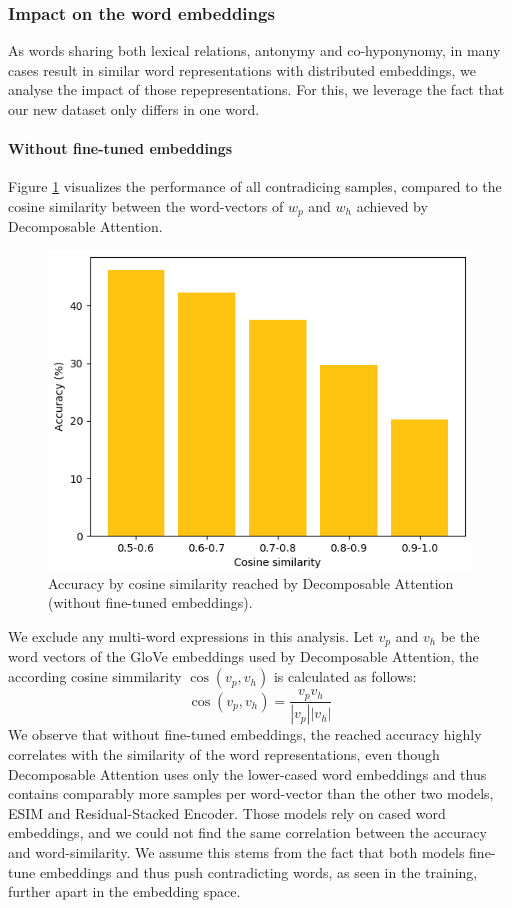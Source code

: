 \subsubsection{Impact on the word embeddings}
As words sharing both lexical relations, antonymy and co-hyponynomy, in many cases result in similar word representations with distributed embeddings, we analyse the impact of those repepresentations. For this, we leverage the fact that our new dataset only differs in one word.
\paragraph*{Without fine-tuned embeddings}
Figure \ref{fig:decomp_acc_per_cos_sim} visualizes the performance of all contradicing samples, compared to the cosine similarity between the word-vectors of $w_p$ and $w_h$ achieved by Decomposable Attention. 
\begin{figure}[tph!]
\centering
	\includegraphics[totalheight=5cm]{fig/acc_by_cos.png}
	\caption{Accuracy by cosine similarity reached by Decomposable Attention (without fine-tuned embeddings).}
	\label{fig:decomp_acc_per_cos_sim}
\end{figure}
We exclude any multi-word expressions in this analysis. Let $v_p$ and $v_h$ be the word vectors of the GloVe embeddings used by Decomposable Attention, the according cosine simmilarity $\cos(v_p,v_h)$ is calculated as follows:
\begin{equation}
\cos(v_p,v_h) = \frac{v_p v_h}{|v_p| |v_h|}
\end{equation}
We observe that without fine-tuned embeddings, the reached accuracy highly correlates with the similarity of the word representations, even though Decomposable Attention uses only the lower-cased word embeddings and thus contains comparably more samples per word-vector than the other two models, ESIM and Residual-Stacked Encoder. Those models rely on cased word embeddings, and we could not find the same correlation between the accuracy and word-similarity. We assume this stems from the fact that both models fine-tune embeddings and thus push contradicting words, as seen in the training, further apart in the embedding space. 
